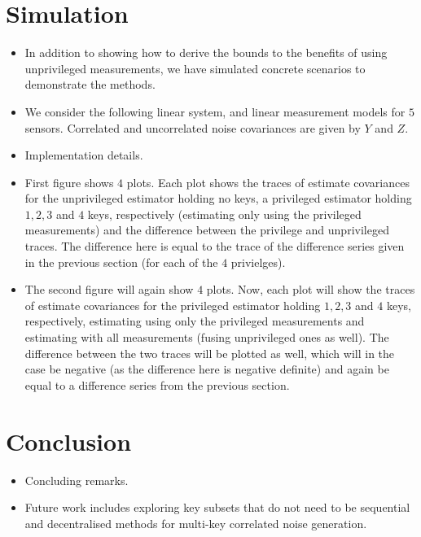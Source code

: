 \documentclass[conference]{IEEEtran}
\begin{document}
\section{Simulation}
\begin{itemize}
  \item In addition to showing how to derive the bounds to the benefits of using unprivileged measurements, we have simulated concrete scenarios to demonstrate the methods.
  \item We consider the following linear system, and linear measurement models for $5$ sensors. Correlated and uncorrelated noise covariances are given by $Y$ and $Z$.
  \item Implementation details.
  \item First figure shows $4$ plots. Each plot shows the traces of estimate covariances for the unprivileged estimator holding no keys, a privileged estimator holding $1,2,3$ and $4$ keys, respectively (estimating only using the privileged measurements) and the difference between the privilege and unprivileged traces. The difference here is equal to the trace of the difference series given in the previous section (for each of the $4$ privielges).
  \item The second figure will again show $4$ plots. Now, each plot will show the traces of estimate covariances for the privileged estimator holding $1,2,3$ and $4$ keys, respectively, estimating using only the privileged measurements and estimating with all measurements (fusing unprivileged ones as well). The difference between the two traces will be plotted as well, which will in the case be negative (as the difference here is negative definite) and again be equal to a difference series from the previous section.
\end{itemize}


\section{Conclusion}
\begin{itemize}
  \item Concluding remarks.
  \item Future work includes exploring key subsets that do not need to be sequential and decentralised methods for multi-key correlated noise generation.
\end{itemize}


\end{document}
